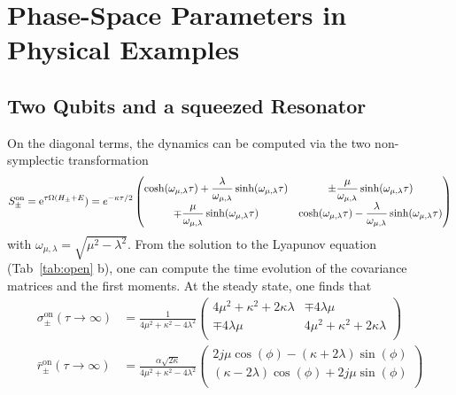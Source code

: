 \documentclass[%
reprint,
superscriptaddress,
nofootinbib,
 amsmath,amssymb,
prx,
floatfix,
]{revtex4-2}
\begin{document}
\section{Phase-Space Parameters in Physical Examples \label{app:examples}}

\subsection{Two Qubits and a squeezed Resonator}

On the diagonal terms, the dynamics can be computed via the two non-symplectic transformation
\begin{equation}
    S^{\text{on}}_\pm = {\rm e}^{\tau \Omega (H_{\pm} + E} ) = e^{-\kappa\tau/2}
\begin{pmatrix}
\cosh(\omega_{\mu, \lambda} \tau)+\dfrac{ \lambda}{\omega_{\mu, \lambda}}\sinh(\omega_{\mu, \lambda} \tau) & \pm\dfrac{\mu}{\omega_{\mu, \lambda}}\sinh(\omega_{\mu, \lambda} \tau) \\
\mp\dfrac{\mu}{\omega_{\mu, \lambda}}\sinh(\omega_{\mu, \lambda} \tau) & \cosh(\omega_{\mu, \lambda} \tau)-\dfrac{ \lambda}{\omega_{\mu, \lambda}}\sinh(\omega_{\mu, \lambda} \tau)
\end{pmatrix}
\nonumber
\end{equation}
with $\omega_{\mu, \lambda} = \sqrt{\mu^2- \lambda^2}$. From the solution to the Lyapunov equation  (Tab~\ref{tab:open} b), one can compute the time evolution of the covariance matrices and the first moments. At the steady state, one finds that 
  \begin{align}
       \sigma_{\pm}^\text{on} (\tau \to \infty) &=\frac{1}{4  \mu ^2+\kappa ^2-4 \lambda ^2}
\begin{pmatrix}
 4   \mu ^2+\kappa ^2+2 \kappa  \lambda  & \mp 4  \lambda  \mu  \\
 \mp 4  \lambda  \mu  & 4   \mu ^2+\kappa ^2+2 \kappa  \lambda  \\
\end{pmatrix} \\
\bar{r}_{\pm}^\text{on} (\tau \to \infty) &= \frac{\alpha  \sqrt{2 \kappa }}{4   \mu ^2+\kappa ^2-4 \lambda ^2}
\begin{pmatrix}
 2 j \mu  \cos (\phi )-(\kappa +2 \lambda ) \sin (\phi ) \\
 (\kappa -2 \lambda ) \cos (\phi )+2 j \mu  \sin (\phi ) \\
\end{pmatrix}
   \end{align}
\end{document}
